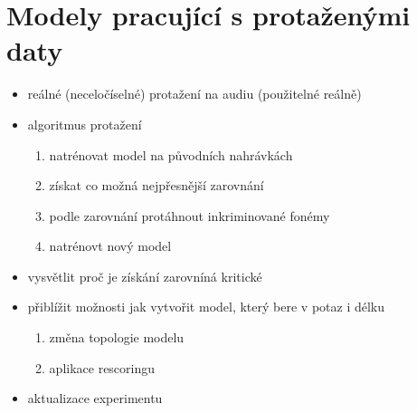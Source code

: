 \section{Modely pracující s protaženými daty}
\label{chap:experiments:durationmodels}

\begin{itemize}
  \item reálné (neceločíselné) protažení na audiu (použitelné reálně)
  \item algoritmus protažení
  \begin{enumerate}
    \item natrénovat model na původních nahrávkách
    \item získat co možná nejpřesnější zarovnání
    \item podle zarovnání protáhnout inkriminované fonémy
    \item natrénovt nový model
  \end{enumerate}
  \item vysvětlit proč je získání zarovníná kritické
  \item přiblížit možnosti jak vytvořit model, který bere v potaz i délku
  \begin{enumerate}
    \item změna topologie modelu
    \item aplikace rescoringu
  \end{enumerate}
  \item aktualizace experimentu 
\end{itemize}

